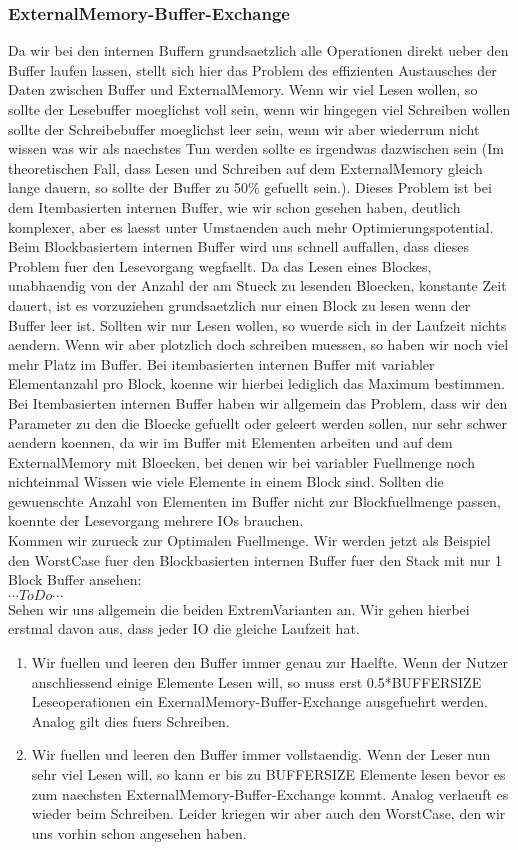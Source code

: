 \documentclass[10pt,a4paper]{article}
\begin{document}
\subsubsection{ExternalMemory-Buffer-Exchange}
Da wir bei den internen Buffern grundsaetzlich alle Operationen direkt ueber den Buffer laufen lassen, stellt sich hier das Problem des effizienten Austausches der Daten zwischen Buffer und ExternalMemory. Wenn wir viel Lesen wollen, so sollte der Lesebuffer moeglichst voll sein, wenn wir hingegen viel Schreiben wollen sollte der Schreibebuffer moeglichst leer sein, wenn wir aber wiederrum nicht wissen was wir als naechstes Tun werden sollte es irgendwas dazwischen sein (Im theoretischen Fall, dass Lesen und Schreiben auf dem ExternalMemory gleich lange dauern, so sollte der Buffer zu 50\% gefuellt sein.). Dieses Problem ist bei dem Itembasierten internen Buffer, wie wir schon gesehen haben, deutlich komplexer, aber es laesst unter Umstaenden auch mehr Optimierungspotential. Beim Blockbasiertem internen Buffer wird uns schnell auffallen, dass dieses Problem fuer den Lesevorgang wegfaellt. Da das Lesen eines Blockes, unabhaendig von der Anzahl der am Stueck zu lesenden Bloecken, konstante Zeit dauert, ist es vorzuziehen grundsaetzlich nur einen Block zu lesen wenn der Buffer leer ist. Sollten wir nur Lesen wollen, so wuerde sich in der Laufzeit nichts aendern. Wenn wir aber plotzlich doch schreiben muessen, so haben wir noch viel mehr Platz im Buffer. Bei itembasierten internen Buffer mit variabler Elementanzahl pro Block, koenne wir hierbei lediglich das Maximum bestimmen.\\
Bei Itembasierten internen Buffer haben wir allgemein das Problem, dass wir den Parameter zu den die Bloecke gefuellt oder geleert werden sollen, nur sehr schwer aendern koennen, da wir im Buffer mit Elementen arbeiten und auf dem ExternalMemory mit Bloecken, bei denen wir bei variabler Fuellmenge noch nichteinmal Wissen wie viele Elemente in einem Block sind. Sollten die gewuenschte Anzahl von Elementen im Buffer nicht zur Blockfuellmenge passen, koennte der Lesevorgang mehrere IOs brauchen.\\
Kommen wir zurueck zur Optimalen Fuellmenge. Wir werden jetzt als Beispiel den WorstCase fuer den Blockbasierten internen Buffer fuer den Stack mit nur 1 Block Buffer ansehen:\\
$\cdots ToDo \cdots$\\
Sehen wir uns allgemein die beiden ExtremVarianten an. Wir gehen hierbei erstmal davon aus, dass jeder IO die gleiche Laufzeit hat.
\begin{enumerate}
\item Wir fuellen und leeren den Buffer immer genau zur Haelfte. Wenn der Nutzer anschliessend einige Elemente Lesen will, so muss erst 0.5*BUFFERSIZE Leseoperationen ein ExernalMemory-Buffer-Exchange ausgefuehrt werden. Analog gilt dies fuers Schreiben.
\item Wir fuellen und leeren den Buffer immer vollstaendig. Wenn der Leser nun sehr viel Lesen will, so kann er bis zu BUFFERSIZE Elemente lesen bevor es zum naechsten ExternalMemory-Buffer-Exchange kommt. Analog verlaeuft es wieder beim Schreiben. Leider kriegen wir aber auch den WorstCase, den wir uns vorhin schon angesehen haben.
\end{enumerate}
\end{document}
